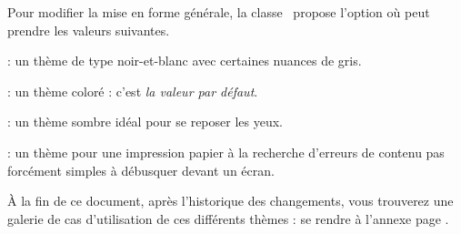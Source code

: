 Pour modifier la mise en forme générale, la classe \thisproj\ propose l'option  où  peut prendre les valeurs suivantes.

\begin{tasks}[style=itemize]
    \task {}:
          un thème de type noir-et-blanc avec certaines nuances de gris.

    \task {}:
          un thème coloré : c'est \emph{la valeur par défaut}.

    \task {}:
          un thème sombre idéal pour se reposer les yeux.

    \task {}:
          un thème pour une impression papier à la recherche d'erreurs de contenu pas forcément simples à débusquer devant un écran.
\end{tasks}


\begin{tdocnote}
    À la fin de ce document, après l'historique des changements, vous trouverez une galerie de cas d'utilisation de ces différents thèmes : se rendre à l'annexe page \pageref{tutodoc-theme-gallery}.
\end{tdocnote}





